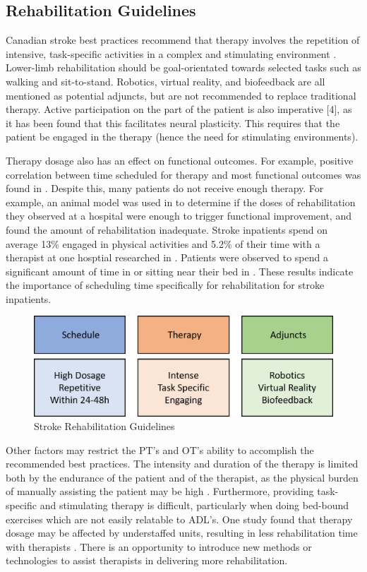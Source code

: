 \documentclass[12pt]{report}
\begin{document}
\subsection{Rehabilitation Guidelines}

Canadian stroke best practices recommend that therapy involves the repetition of intensive, task-specific activities in a complex and stimulating environment \cite{Hebert2016}. Lower-limb rehabilitation should be goal-orientated towards selected tasks such as walking and sit-to-stand. Robotics, virtual reality, and biofeedback are all mentioned as potential adjuncts, but are not recommended to replace traditional therapy.  Active participation on the part of the patient is also imperative [4], as it has been found that this facilitates neural plasticity. This requires that the patient be engaged in the therapy (hence the need for stimulating environments).

Therapy dosage also has an effect on functional outcomes. For example, positive correlation between time scheduled for therapy and most functional outcomes was found in \cite{Lohse2014}. Despite this, many patients do not receive enough therapy. For example, an animal model was used in \cite{Lang2009} to determine if the doses of rehabilitation they observed at a hospital were enough to trigger functional improvement, and found the amount of rehabilitation inadequate. Stroke inpatients spend on average 13\% engaged in physical activities and 5.2\% of their time with a therapist at one hosptial researched in \cite{Bernhardt2004}. Patients were observed to spend a significant amount of time in or sitting near their bed in \cite{King2011}. These results indicate the importance of scheduling time specifically for rehabilitation for stroke inpatients. 

	\begin{figure}[h] 
		\centering
		\includegraphics[width=0.75\linewidth]{guidelines}
		\caption{Stroke Rehabilitation Guidelines}
		\label{fig:guidelines}
	\end{figure}

Other factors may restrict the PT's and OT's ability to accomplish the recommended best practices. The intensity and duration of the therapy is limited both by the endurance of the patient and of the therapist, as the physical burden of manually assisting the patient may be high \cite{Colombo}. Furthermore, providing task-specific and stimulating therapy is difficult, particularly when doing bed-bound exercises which are not easily relatable to ADL's. One study found that therapy dosage may be affected by understaffed units, resulting in less rehabilitation time with therapists \cite{Mchugh2013}. There is an opportunity to introduce new methods or technologies to assist therapists in delivering more rehabilitation.
\end{document}

